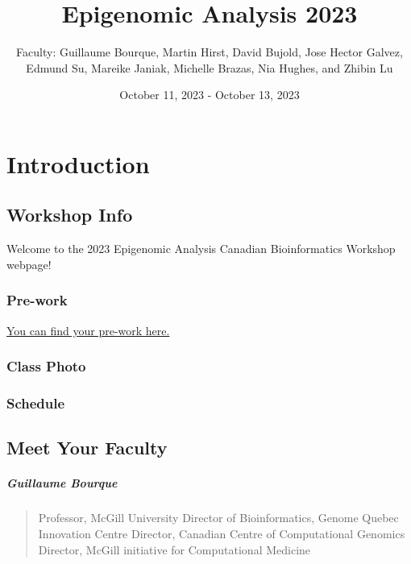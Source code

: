 \documentclass[
]{book}
\title{Epigenomic Analysis 2023}
\author{Faculty: Guillaume Bourque, Martin Hirst, David Bujold, Jose Hector Galvez, Edmund Su, Mareike Janiak, Michelle Brazas, Nia Hughes, and Zhibin Lu}
\date{October 11, 2023 - October 13, 2023}
\begin{document}
\maketitle

{
\setcounter{tocdepth}{1}
\tableofcontents
}
\part{Introduction}\label{part-introduction}

\chapter{Workshop Info}\label{workshop-info}

Welcome to the 2023 Epigenomic Analysis Canadian Bioinformatics Workshop webpage!

\section{Pre-work}\label{pre-work}

\href{https://docs.google.com/forms/d/e/1FAIpQLSdxqrJpgL5nJkGTSDChZ4-GFxPuyFp10vh2riHnzK8knJrBjw/viewform?usp=sf_link}{You can find your pre-work here.}

\section{Class Photo}\label{class-photo}

\section{Schedule}\label{schedule}

\chapter{Meet Your Faculty}\label{meet-your-faculty}

\subsubsection{Guillaume Bourque}\label{guillaume-bourque}

\begin{quote}
Professor, McGill University
Director of Bioinformatics, Genome Quebec Innovation Centre
Director, Canadian Centre of Computational Genomics
Director, McGill initiative for Computational Medicine
\end{quote}
\end{document}
